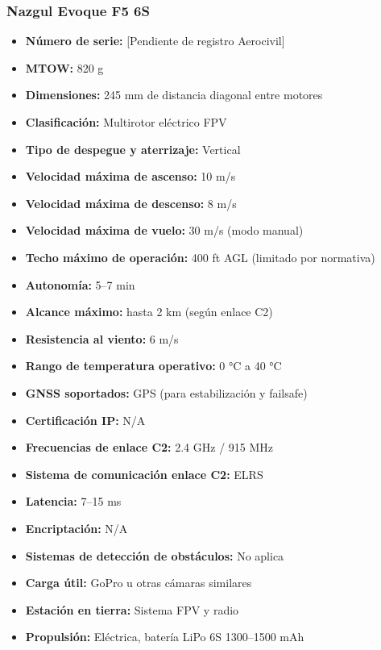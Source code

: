 \subsubsection*{Nazgul Evoque F5 6S}
\begin{itemize}
    \item \textbf{Número de serie:} [Pendiente de registro Aerocivil]
    \item \textbf{MTOW:} 820 g
    \item \textbf{Dimensiones:} 245 mm de distancia diagonal entre motores
    \item \textbf{Clasificación:} Multirotor eléctrico FPV 
    \item \textbf{Tipo de despegue y aterrizaje:} Vertical
    \item \textbf{Velocidad máxima de ascenso:} 10 m/s
    \item \textbf{Velocidad máxima de descenso:} 8 m/s
    \item \textbf{Velocidad máxima de vuelo:} 30 m/s (modo manual)
    \item \textbf{Techo máximo de operación:} 400 ft AGL (limitado por normativa)
    \item \textbf{Autonomía:} 5–7 min
    \item \textbf{Alcance máximo:} hasta 2 km (según enlace C2)
    \item \textbf{Resistencia al viento:} 6 m/s
    \item \textbf{Rango de temperatura operativo:} 0 °C a 40 °C
    \item \textbf{GNSS soportados:} GPS (para estabilización y failsafe)
    \item \textbf{Certificación IP:} N/A
    \item \textbf{Frecuencias de enlace C2:} 2.4 GHz / 915 MHz
    \item \textbf{Sistema de comunicación enlace C2:} ELRS 
    \item \textbf{Latencia:} 7–15 ms
    \item \textbf{Encriptación:} N/A
    \item \textbf{Sistemas de detección de obstáculos:} No aplica
    \item \textbf{Carga útil:} GoPro u otras cámaras similares
    \item \textbf{Estación en tierra:} Sistema FPV y radio
    \item \textbf{Propulsión:} Eléctrica, batería LiPo 6S 1300–1500 mAh
\end{itemize}

